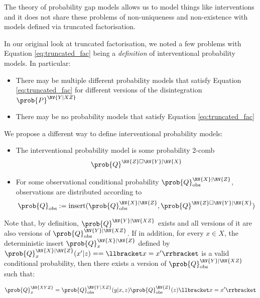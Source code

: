 The theory of probability gap models allows us to model things like interventions and it does not share these problems of non-uniqueness and non-existence with models defined via truncated factorisation.

In our original look at truncated factorisation, we noted a few problems with Equation \ref{eq:truncated_fac} being a \emph{definition} of interventional probability models. In particular:

\begin{itemize}
    \item There may be multiple different probability models that satisfy Equation \ref{eq:truncated_fac} for different versions of the disintegration $\prob{P}^{\RV{Y|XZ}}$
    \item There may be no probability models that satisfy Equation \ref{eq:truncated_fac}
\end{itemize}

We propose a different way to define interventional probability models:

\begin{itemize}
    \item The interventional probability model is some probability 2-comb 
    \begin{align}
        \prob{Q}^{\RV{Z}\square\RV{Y}|\RV{X}}
    \end{align}
    \item For some observational conditional probability $\prob{Q}_{\text{obs}}^{\RV{X}|\RV{Z}}$, observations are distributed according to 
    \begin{align}
    \prob{Q}_{\text{obs}}:=\text{insert}(\prob{Q}_{\text{obs}}^{\RV{X}|\RV{Z}},\prob{Q}^{\RV{Z}\square\RV{Y}|\RV{X}})\label{eq:int_to_obs}
    \end{align}
\end{itemize}

Note that, by definition, $\prob{Q}^{\RV{Y}|\RV{XZ}}$ exists and all versions of it are also versions of $\prob{Q}_{\text{obs}}^{\RV{Y}|\RV{XZ}}$. If in addition, for every $x\in X$, the deterministic insert $\prob{Q}_{x}^{\RV{X}|\RV{Z}}$ defined by $\prob{Q}_{x}^{\RV{X}|\RV{Z}}(x'|z) == \llbracket x=x' \rrbracket$ is a valid conditional probability, then there exists a version of $\prob{Q}_{\text{obs}}^{\RV{Y}|\RV{XZ}}$ such that:

\begin{align}
    \prob{Q}_x^{\RV{XYZ}} = \prob{Q}_{\text{obs}}^{\RV{Y|XZ}}(y|x,z)\prob{Q}_{\text{obs}}^{\RV{Z}}(z)\llbracket x=x' \rrbracket
\end{align}


